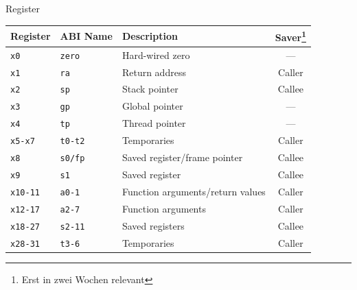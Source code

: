 \begin{frame}[c]{Register}{}
	\begin{center}
		{\rmfamily
			\begin{tabular}{|l|l|l|c|}
				\hline
				Register        & ABI Name       & Description                      & Saver\footnote{Erst in zwei Wochen relevant} \\ \hline
				\texttt{x0}     & \texttt{zero}  & Hard-wired zero                  & ---                                          \\
				\rowcolor{altblue}
				\texttt{x1}     & \texttt{ra}    & Return address                   & Caller                                       \\
				\texttt{x2}     & \texttt{sp}    & Stack pointer                    & Callee                                       \\
				\texttt{x3}     & \texttt{gp}    & Global pointer                   & ---                                          \\
				\texttt{x4}     & \texttt{tp}    & Thread pointer                   & ---                                          \\
				\texttt{x5-x7}  & \texttt{t0-t2} & Temporaries                      & Caller                                       \\
				\texttt{x8}     & \texttt{s0/fp} & Saved register/frame pointer     & Callee                                       \\
				\texttt{x9}     & \texttt{s1}    & Saved register                   & Callee                                       \\
				\rowcolor{altyellow}
				\texttt{x10-11} & \texttt{a0-1}  & Function arguments/return values & Caller                                       \\
				\texttt{x12-17} & \texttt{a2-7}  & Function arguments               & Caller                                       \\
				\rowcolor{altmagenta}
				\texttt{x18-27} & \texttt{s2-11} & Saved registers                  & Callee                                       \\
				\rowcolor{altgreen}
				\texttt{x28-31} & \texttt{t3-6}  & Temporaries                      & Caller                                       \\ \hline
			\end{tabular}
		}
	\end{center}
\end{frame}

